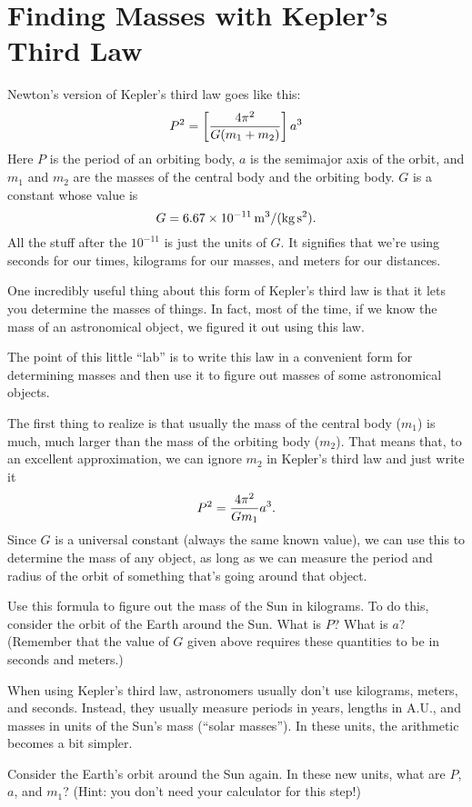 \chapter{Finding Masses with Kepler's Third Law}


Newton's version of Kepler's third law goes like this:
$$
P^2=\left[4\pi^2\over G(m_1+m_2)\right]a^3
$$
Here $P$ is the period of an orbiting body, $a$ is the semimajor axis
of the orbit, and $m_1$ and $m_2$ are the masses of the central body
and the orbiting body.  $G$ is a constant whose value is
$$
G=6.67\times 10^{-11}\,{\rm m^3/(kg\,s^2)}.
$$
All the stuff after the $10^{-11}$ is just the units of $G$.
It signifies that we're using seconds for our times, kilograms for
our masses, and meters for our distances.

One incredibly useful thing about this form of Kepler's third law
is that it lets you determine the masses of things.  In fact, most
of the time, if we know the mass of an astronomical object, we figured
it out using this law.

The point of this little ``lab'' is to write this law in a convenient
form for determining masses and then use it to figure out 
masses of some astronomical objects.

The first thing to realize is that usually the mass of the central
body ($m_1$) is much, much larger than the mass of the orbiting
body ($m_2$).  That means that, to an excellent approximation, we can
ignore $m_2$ in Kepler's third law and just write it
$$
P^2={4\pi^2\over Gm_1}a^3.
$$
Since $G$ is a universal constant (always the same known value), 
we can use this to determine the mass of any object, as long as we 
can measure the period and radius of the orbit of something
that's going around that object.

Use this formula to figure out the mass of the Sun in kilograms.  To do this,
consider the orbit of the Earth around the Sun.  What is $P$?
What is $a$?  (Remember that the value of $G$ given above requires
these quantities to be in seconds and meters.)

\vskip 2in

When using Kepler's third law, astronomers usually don't use kilograms,
meters, and seconds.  Instead, they usually measure periods in years,
lengths in A.U., and masses in units of the Sun's mass (``solar masses'').
In these units, the arithmetic becomes a bit simpler.

Consider the Earth's orbit around the Sun again.  In these new units,
what are $P$, $a$, and $m_1$?  (Hint: you don't need your calculator for
this step!)

